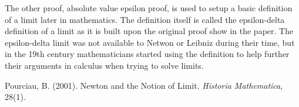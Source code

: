 \documentclass[a4paper, 12pt]{article}
\begin{document}
The other proof, absolute value epsilon proof, is used to setup a basic definition of a limit later in mathematics. The definition itself is called the epsilon-delta definition of a limit as it is built upon the original proof show in the paper. The epsilon-delta limit was not available to Netwon or Leibniz during their time, but in the 19th century mathematicians started using the definition to help further their arguments in calculus when trying to solve limits. \cite{bruce1}


\begin{thebibliography}{9}

 Pourciau, B. (2001). Newton and the Notion of Limit. \emph{Historia Mathematica}, 28(1).

\end{thebibliography}
\end{document}
